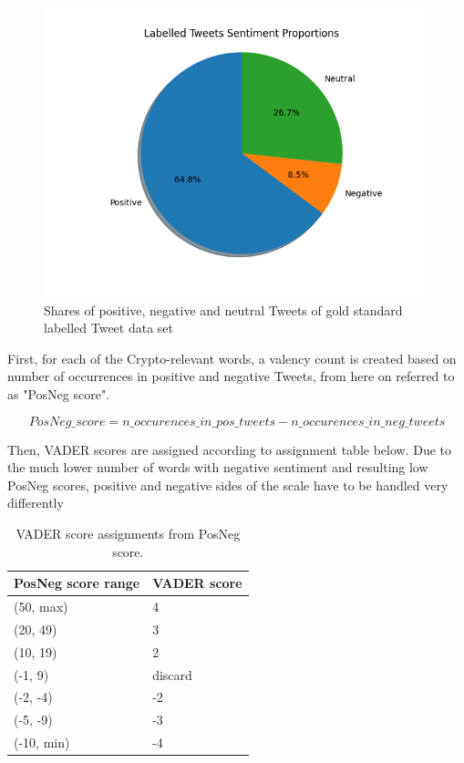 \documentclass[11pt]{article}
\begin{document}
\begin{figure}[H]
\centering
\includegraphics[scale=0.6]{figures/gold_sentiment_proportions.png}
\caption {Shares of positive, negative and neutral Tweets of gold standard labelled Tweet data set}
\label{fig:gold_standard_proportions}
\end{figure}

First, for each of the Crypto-relevant words, a valency count is created based on number of occurrences in positive and negative Tweets, from here on referred to as "PosNeg score". 

\begin{equation}
PosNeg\_score = n\_occurences\_in\_pos\_tweets - n\_occurences\_in\_neg\_tweets
\end{equation}

Then, VADER scores are assigned according to assignment table below. Due to the much lower number of words with negative sentiment and resulting low PosNeg scores, positive and negative sides of the scale have to be handled very differently \\

\begin{table}[H]
\renewcommand{\arraystretch}{1.2}
\centering
\caption{\label{table:vader-score-assignment} VADER score assignments from PosNeg score.}
\begin{tabular}{ll}
\textbf{PosNeg score range} & \textbf{VADER score} \\ \midrule
(50,  max) & 4   \\  
(20,  49) & 3   \\ 
(10,  19) & 2   \\ 
(-1,  9) & discard   \\ 
(-2, -4) & -2   \\ 
(-5, -9) & -3   \\ 
(-10, min) & -4   \\ 
\bottomrule
\end{tabular}
\end{table}
\end{document}

